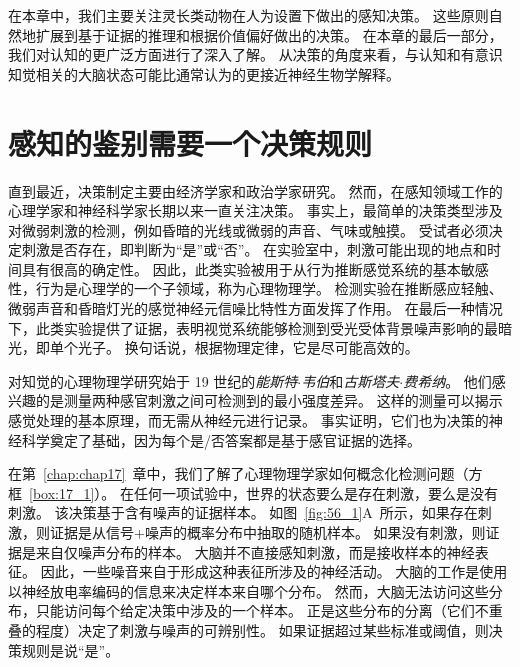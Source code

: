 在本章中，我们主要关注灵长类动物在人为设置下做出的感知决策。
这些原则自然地扩展到基于证据的推理和根据价值偏好做出的决策。
在本章的最后一部分，我们对认知的更广泛方面进行了深入了解。
从决策的角度来看，与认知和有意识知觉相关的大脑状态可能比通常认为的更接近神经生物学解释。



\section{感知的鉴别需要一个决策规则}

直到最近，决策制定主要由经济学家和政治学家研究。
然而，在感知领域工作的心理学家和神经科学家长期以来一直关注决策。
事实上，最简单的决策类型涉及对微弱刺激的检测，例如昏暗的光线或微弱的声音、气味或触摸。
受试者必须决定刺激是否存在，即判断为“是”或“否”。
在实验室中，刺激可能出现的地点和时间具有很高的确定性。
因此，此类实验被用于从行为推断感觉系统的基本敏感性，行为是心理学的一个子领域，称为心理物理学。
检测实验在推断感应轻触、微弱声音和昏暗灯光的感觉神经元信噪比特性方面发挥了作用。
在最后一种情况下，此类实验提供了证据，表明视觉系统能够检测到受光受体背景噪声影响的最暗光，即单个光子。
换句话说，根据物理定律，它是尽可能高效的。


对知觉的心理物理学研究始于 19 世纪的\textit{能斯特$\cdot$韦伯}和\textit{古斯塔夫$\cdot$费希纳}。
他们感兴趣的是测量两种感官刺激之间可检测到的最小强度差异。
这样的测量可以揭示感觉处理的基本原理，而无需从神经元进行记录。
事实证明，它们也为决策的神经科学奠定了基础，因为每个是/否答案都是基于感官证据的选择。


在第~\ref{chap:chap17}~章中，我们了解了心理物理学家如何概念化检测问题（方框~\ref{box:17_1}）。
在任何一项试验中，世界的状态要么是存在刺激，要么是没有刺激。
该决策基于含有噪声的证据样本。
如图~\ref{fig:56_1}A~所示，如果存在刺激，则证据是从信号+噪声的概率分布中抽取的随机样本。
如果没有刺激，则证据是来自仅噪声分布的样本。
大脑并不直接感知刺激，而是接收样本的神经表征。
因此，一些噪音来自于形成这种表征所涉及的神经活动。
大脑的工作是使用以神经放电率编码的信息来决定样本来自哪个分布。
然而，大脑无法访问这些分布，只能访问每个给定决策中涉及的一个样本。
正是这些分布的分离（它们不重叠的程度）决定了刺激与噪声的可辨别性。
如果证据超过某些标准或阈值，则决策规则是说“是”。


